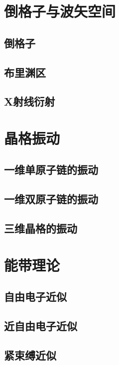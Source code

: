 \chapter{倒格子与波矢空间}\label{chap:2}
\section{倒格子}
\section{布里渊区}
\section{X射线衍射}

\chapter{晶格振动}
\section{一维单原子链的振动}
\section{一维双原子链的振动}
\section{三维晶格的振动}

\chapter{能带理论}
\section{自由电子近似}
\section{近自由电子近似}
\section{紧束缚近似}